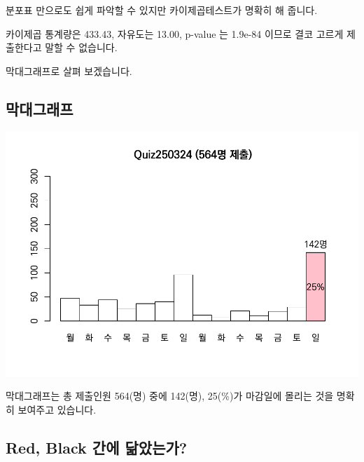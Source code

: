 \documentclass[
]{book}
\begin{document}
분포표 만으로도 쉽게 파악할 수 있지만 카이제곱테스트가 명확히 해 줍니다.

카이제곱 통계량은 433.43, 자유도는 13.00, p-value 는 1.9e-84 이므로 결코 고르게 제출한다고 말할 수 없습니다.

막대그래프로 살펴 보겠습니다.

\subsection{막대그래프}\label{uxb9c9uxb300uxadf8uxb798uxd504-3}

\includegraphics{Quiz_report_2025_files/figure-latex/unnamed-chunk-86-1.pdf}

막대그래프는 총 제출인원 564(명) 중에 142(명), 25(\%)가 마감일에 몰리는 것을 명확히 보여주고 있습니다.

\subsection{Red, Black 간에 닮았는가?}\label{red-black-uxac04uxc5d0-uxb2eeuxc558uxb294uxac00-3}
\end{document}
